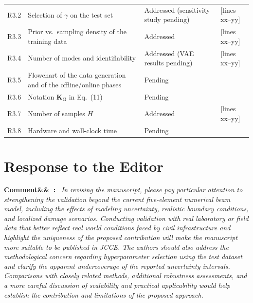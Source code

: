 \documentclass[11pt]{article}
\newenvironment{rcomment}[1]{\par\bigskip\noindent\textbf{Comment\ifx&#1&\else\ #1\fi:}\ \itshape}{\par}
\newcommand{\tbd}[1]{\textcolor{note}{\textsf{[#1]}}}
\newcommand{\lines}[1]{\tbd{lines #1}}
\begin{document}
{\begin{longtable}{p{1.55cm}p{6.0cm}p{3.0cm}p{3.6cm}}
R3.2 & Selection of $\gamma$ on the test set & Addressed (sensitivity study pending) & \lines{xx--yy} \\
R3.3 & Prior vs.\ sampling density of the training data & Addressed & \lines{xx--yy} \\
R3.4 & Number of modes and identifiability & Addressed (VAE results pending) & \lines{xx--yy} \\
R3.5 & Flowchart of the data generation and of the offline/online phases & Pending & \\
R3.6 & Notation $\mathbf{K}_{\mathrm{G}}$ in Eq.~(11) & Pending & \\
R3.7 & Number of samples $H$ & Addressed & \lines{xx--yy} \\
R3.8 & Hardware and wall-clock time & Pending & \\
\bottomrule
\end{longtable}
}

\section{Response to the Editor}

\begin{rcomment}{}
In revising the manuscript, please pay particular attention to strengthening the validation beyond the current
five-element numerical beam model, including the effects of modeling uncertainty, realistic boundary conditions, and
localized damage scenarios. Conducting validation with real laboratory or field data that better reflect real world
conditions faced by civil infrastructure and highlight the uniqueness of the proposed contribution will make the
manuscript more suitable to be published in JCCE. The authors should also address the methodological concern regarding
hyperparameter selection using the test dataset and clarify the apparent undercoverage of the reported uncertainty
intervals. Comparisons with closely related methods, additional robustness assessments, and a more careful discussion of
scalability and practical applicability would help establish the contribution and limitations of the proposed approach.
\end{rcomment}
\end{document}
